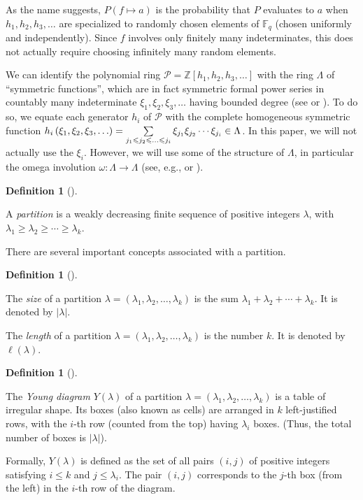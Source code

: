 \documentclass[numbers=enddot,12pt,final,onecolumn,notitlepage]{scrartcl}%
\theoremstyle{definition}
\newtheorem{defi}[theo]{Definition}
\newenvironment{definition}[1][]
{\begin{defi}[#1]\begin{leftbar}}
{\end{leftbar}\end{defi}}
\let\sumnonlimits\sum
\renewcommand{\sum}{\sumnonlimits\limits}
\newcommand{\abs}[1]{\left| #1 \right|}
\newcommand{\tup}[1]{\left( #1 \right)}
\newcommand{\Fq}{\mathbb{F}_q}
\renewcommand{\leq}{\leqslant}
\renewcommand{\geq}{\geqslant}
\theoremstyle{plainsl}
\begin{document}
As the name suggests, $P\tup{f \mapsto a}$ is the probability that
$P$ evaluates to $a$ when $h_1, h_2, h_3, \ldots$ are specialized
to randomly chosen elements of $\Fq$ (chosen uniformly and
independently). Since $f$ involves only finitely many indeterminates,
this does not actually require choosing infinitely many random
elements.

We can identify the polynomial ring
$\mathcal{P}=\mathbb{Z}\left[  h_{1},h_{2},h_{3},\ldots\right]  $
with the ring $\Lambda$ of ``symmetric
functions'', which are in fact symmetric formal power series in
countably many indeterminate $\xi_{1},\xi_{2},\xi_{3},\ldots$
having bounded degree (see \cite[Section 7.1]{EC2} or
\cite[Section I.2]{Macdonald}).
To do so, we equate each generator $h_i$ of $\mathcal{P}$
with the complete homogeneous symmetric function
$h_i\tup{\xi_1, \xi_2, \xi_3, \ldots}
= \sum\limits_{j_1 \leq j_2 \leq \ldots \leq j_i}
\xi_{j_1} \xi_{j_2} \cdots \xi_{j_i} \in \Lambda$.
In this paper, we will not actually use the $\xi_i$.
However, we will use some of the structure of $\Lambda$, in
particular the omega involution $\omega : \Lambda \to \Lambda$
(see, e.g., \cite[Section 7.6]{EC2} or \cite[(I.2.7)]{Macdonald}).

\begin{definition}
A \emph{partition} is a
weakly decreasing finite sequence of positive integers
$\lambda$, with
$\lambda_1 \geq \lambda_2 \geq \cdots \geq \lambda_k$.
\end{definition}


There are several important concepts associated with a partition.

\begin{definition}
The \emph{size} of a partition
$\lambda = \left(\lambda_1, \lambda_2, \ldots, \lambda_k\right)$
is the sum $\lambda_1 + \lambda_2 + \cdots + \lambda_k$.
It is denoted by $\abs{\lambda}$.

The \emph{length} of a partition
$\lambda = \left(\lambda_1, \lambda_2, \ldots, \lambda_k\right)$
is the number $k$.
It is denoted by $\ell\tup{\lambda}$.
\end{definition}

\begin{definition}
The \emph{Young diagram} $Y\tup{\lambda}$ of a partition
$\lambda = \left(\lambda_1, \lambda_2, \ldots, \lambda_k\right)$
is a table of irregular shape.
Its boxes (also known as cells) are arranged in
$k$ left-justified rows, with the $i$-th row (counted from the top)
having $\lambda_i$ boxes. (Thus, the total number of boxes
is $\abs{\lambda}$).

Formally, $Y\tup{\lambda}$ is defined as the set of all pairs
$\tup{i, j}$ of positive integers satisfying $i \leq k$ and
$j \leq \lambda_i$. The pair $\tup{i, j}$ corresponds to the
$j$-th box (from the left) in the $i$-th row of the diagram.
\end{definition}
\end{document}
